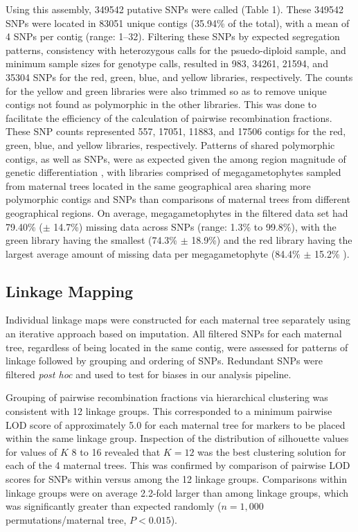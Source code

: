 \documentclass[11pt]{article}
\begin{document}
Using this assembly, \num{349542} putative SNPs were called (Table 1). These  \num{349542} SNPs were located in
\num{83051} unique contigs (35.94\% of the total), with a mean of \num{4} SNPs per contig (range: \SIrange{1}{32}{}). Filtering these SNPs by
expected segregation patterns, consistency with heterozygous calls for the psuedo-diploid sample, and minimum
sample sizes for genotype calls, resulted in \num{983}, \num{34261}, \num{21594}, and \num{35304} SNPs for the red, green, blue, 
and yellow libraries, respectively. The counts for the yellow and green libraries were also trimmed so as to remove
unique contigs not found as polymorphic in the other libraries. This was done to facilitate the efficiency of the calculation of pairwise
recombination fractions. These SNP counts represented \num{557}, \num{17051}, \num{11883}, and \num{17506} contigs
for the red, green, blue, and yellow libraries, respectively. Patterns of shared polymorphic contigs, as well as
SNPs, were as expected given the among region magnitude of genetic differentiation \citep[Figure 2, see][]{Eckert:2008}, 
with libraries comprised of megagametophytes sampled from maternal trees located in 
the same geographical area sharing more polymorphic contigs and SNPs than comparisons of maternal trees from different
geographical regions. On average, megagametophytes in the filtered data set had 79.40\% ($\pm$ 14.7\%) missing data 
across SNPs (range: 1.3\% to 99.8\%), with the green library having the smallest (74.3\% $\pm$ 18.9\%) and the red library having
the largest average amount of missing data per megagametophyte (84.4\% $\pm$ 15.2\% ).

\subsection*{Linkage Mapping}

Individual linkage maps were constructed for each maternal tree separately using an iterative approach
based on imputation. All filtered SNPs for each maternal tree, regardless of being located in the same contig,
were assessed for patterns of linkage followed by grouping and ordering of SNPs. Redundant SNPs were filtered
\textit{post hoc} and used to test for biases in our analysis pipeline.

Grouping of pairwise recombination fractions via hierarchical clustering was consistent with \num{12} linkage groups. 
This corresponded to a minimum pairwise LOD score of approximately 5.0 for each maternal tree for markers to be placed within the same linkage group.
Inspection of the distribution of silhouette values for values of $K$ \num{8} to \num{16} revealed that $K = 12$ was the best 
clustering solution for each of the \num{4} maternal trees. This was confirmed by comparison of pairwise LOD scores 
for SNPs within versus among the \num{12} linkage groups. Comparisons within linkage groups were on average 2.2-fold larger
than among linkage groups, which was significantly greater than expected randomly ($n = 1,000$
permutations/maternal tree, $P < 0.015$). 
\end{document}
